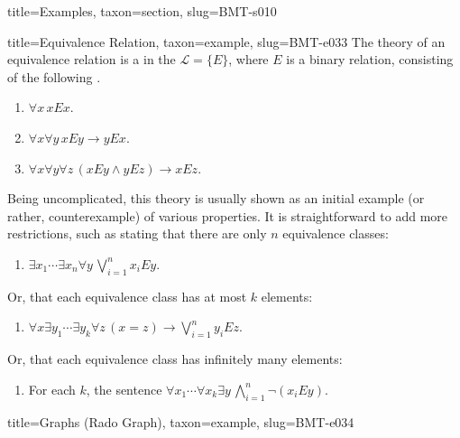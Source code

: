 \documentclass[a4paper]{article}
\begin{document}
\begin{tree}{title={Examples}, taxon={section}, slug={BMT-s010}}
\begin{tree}{title={Equivalence Relation}, taxon={example}, slug={BMT-e033}}
    The theory of an equivalence relation is a  in the  \(\mathcal  L= \{ E \}\),
    where \(E\) is a binary relation, consisting of the following .
    \begin{enumerate}
\item{\(\forall  x \, xEx\).
        }
        \item{\(\forall  x \forall  y \, xEy \rightarrow  yEx\).
        }
        \item{\(\forall  x \forall  y \forall  z \, (xEy \land  yEz) \rightarrow  xEz\).
        }
\end{enumerate}\par{
    Being uncomplicated, this theory is usually shown as an initial example (or rather, counterexample) of various properties.
    It is straightforward to add more restrictions, such as stating that there are only \(n\) equivalence classes:
    \begin{enumerate}
\item{\(\exists  x_1 \cdots \exists  x_n \forall  y \, \bigvee _{i=1}^nx_iEy\).
        }
\end{enumerate}
    Or, that each equivalence class has at most \(k\) elements:
    \begin{enumerate}
\item{\(\forall  x \exists  y_1 \cdots \exists  y_k \forall  z \, (x=z) \rightarrow \bigvee _{i=1}^ny_iEz\).
        }
\end{enumerate}
    Or, that each equivalence class has infinitely many elements:
    \begin{enumerate}
\item{
            For each \(k\), the sentence \(\forall  x_1 \cdots \forall  x_k \exists  y \, \bigwedge _{i=1}^n \neg (x_iEy)\).
        }
\end{enumerate}}
\end{tree}

\begin{tree}{title={Graphs (Rado Graph)}, taxon={example}, slug={BMT-e034}}


\end{tree}
\end{tree}
\end{document}
